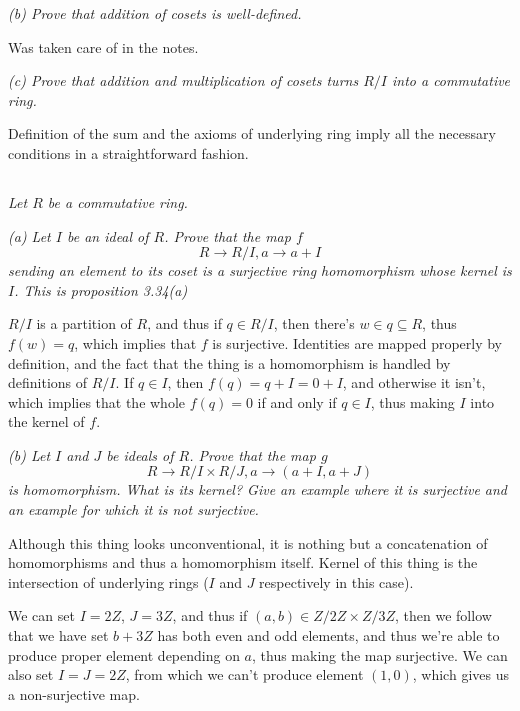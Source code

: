 \documentclass[11pt,oneside,titlepage]{book}
\begin{document}
\textit{(b) Prove that addition of cosets is well-defined.}

Was taken care of in the notes.

\textit{(c) Prove that addition and multiplication of cosets turns
$R/I$ into a commutative ring.}

Definition of the sum and the axioms of underlying ring imply all the
necessary conditions in a straightforward fashion.

\subsection{}

\textit{Let $R$ be a commutative ring.}

\textit{(a) Let $I$ be an ideal of $R$. Prove that the map $f$
  $$R \to R/I, a \to a + I$$
  sending an element to its coset is a surjective ring homomorphism
whose kernel is $I$.  This is proposition 3.34(a)}

$R/I$ is a partition of $R$, and thus if $q \in R/I$, then there's $w
\in q \subseteq R$, thus $f(w) = q$, which implies that $f$ is
surjective. Identities are mapped properly by definition, and the fact
that the thing is a homomorphism is handled by definitions of
$R/I$. If $q \in I$, then $f(q) = q + I = 0 + I$, and otherwise it
isn't, which implies that the whole $f(q) = 0$ if and only if $q \in
I$, thus making $I$ into the kernel of $f$.

\textit{(b) Let $I$ and $J$ be ideals of $R$. Prove that the map $g$
  $$R \to R/I \times R/J, a \to (a + I, a + J)$$
is homomorphism. What is its kernel? Give an example where it is
surjective and an example for which it is not surjective.}

Although this thing looks unconventional, it is nothing but a
concatenation of homomorphisms and thus a homomorphism itself. Kernel
of this thing is the intersection of underlying rings ($I$ and $J$
respectively in this case).

We can set $I = 2Z$, $J = 3Z$, and thus if $(a, b) \in Z/2Z \times
Z/3Z$, then we follow that we have set $b + 3Z$ has both even and odd
elements, and thus we're able to produce proper element depending on
$a$, thus making the map surjective. We can also set $I = J = 2Z$,
from which we can't produce element $(1, 0)$, which gives us a
non-surjective map.

\subsection{}
\end{document}
